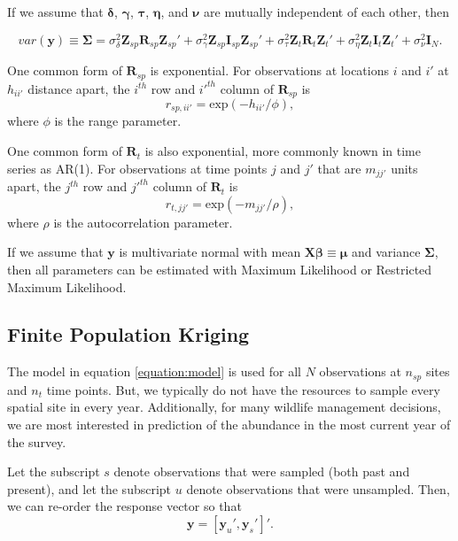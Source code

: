 \documentclass[]{interact}
\theoremstyle{plain}%
\theoremstyle{definition}
\theoremstyle{remark}
\begin{document}
If we assume that \(\bm{\delta}\), \(\bm{\gamma}\), \(\bm{\tau}\),
\(\bm{\eta}\), and \(\bm{\nu}\) are mutually independent of each other,
then

\begin{equation}
var(\mathbf{y}) \equiv \bm{\Sigma} = \sigma^2_{\delta} \mathbf{Z}_{sp} \mathbf{R}_{sp} \mathbf{Z}_{sp}' + \sigma^2_{\gamma} \mathbf{Z}_{sp} \mathbf{I}_{sp} \mathbf{Z}_{sp}' + \sigma^2_{\tau} \mathbf{Z}_t \mathbf{R}_t \mathbf{Z}_t'+ \sigma^2_{\eta} \mathbf{Z}_t \mathbf{I}_t \mathbf{Z}_t' + \sigma^2_{\nu} \mathbf{I}_N.
\end{equation}

One common form of \(\mathbf{R}_{sp}\) is exponential. For observations
at locations \(i\) and \(i'\) at \(h_{ii'}\) distance apart, the
\(i^{th}\) row and \(i'^{th}\) column of \(\mathbf{R}_{sp}\) is \mbox{}
\begin{equation}
r_{sp, ii'} = \text{exp}(-h_{ii'} / \phi),
\end{equation} \noindent where \(\phi\) is the range parameter.

One common form of \(\mathbf{R}_t\) is also exponential, more commonly
known in time series as AR(1). For observations at time points \(j\) and
\(j'\) that are \(m_{jj'}\) units apart, the \(j^{th}\) row and
\(j'^{th}\) column of \(\mathbf{R}_{t}\) is \mbox{} \begin{equation}
r_{t, jj'} = \text{exp}(-m_{jj'} / \rho),
\end{equation} \noindent where \(\rho\) is the autocorrelation
parameter.

If we assume that \(\mathbf{y}\) is multivariate normal with mean
\(\mathbf{X} \bm{\beta} \equiv \bm{\mu}\) and variance \(\bm{\Sigma}\),
then all parameters can be estimated with Maximum Likelihood or
Restricted Maximum Likelihood.

\subsection{Finite Population Kriging}

The model in equation \ref{equation:model} is used for all \(N\)
observations at \(n_{sp}\) sites and \(n_t\) time points. But, we
typically do not have the resources to sample every spatial site in
every year. Additionally, for many wildlife management decisions, we are
most interested in prediction of the abundance in the most current year
of the survey.

Let the subscript \(s\) denote observations that were sampled (both past
and present), and let the subscript \(u\) denote observations that were
unsampled. Then, we can re-order the response vector so that \mbox{}
\begin{equation}
\mathbf{y} = [\mathbf{y}_u', \mathbf{y}_s']'.
\end{equation}
\end{document}
